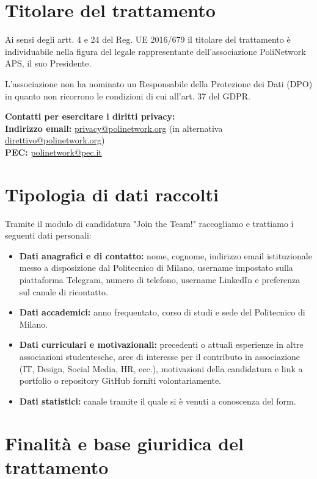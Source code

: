 \documentclass[legal]{polinetwork}
\begin{document}
\pnMakeHeader

\section{Titolare del trattamento}

Ai sensi degli artt. 4 e 24 del Reg. UE 2016/679 il titolare del trattamento è individuabile nella figura del legale rappresentante dell'associazione PoliNetwork APS, il suo Presidente.

L'associazione non ha nominato un Responsabile della Protezione dei Dati (DPO) in quanto non ricorrono le condizioni di cui all'art. 37 del GDPR.

\textbf{Contatti per esercitare i diritti privacy:} \\
\textbf{Indirizzo email:} \href{mailto:privacy@polinetwork.org}{privacy@polinetwork.org} (in alternativa \href{mailto:direttivo@polinetwork.org}{direttivo@polinetwork.org}) \\
\textbf{PEC:} \href{mailto:polinetwork@pec.it}{polinetwork@pec.it}

\section{Tipologia di dati raccolti}

Tramite il modulo di candidatura "Join the Team!" raccogliamo e trattiamo i seguenti dati personali:
\begin{itemize}
    \item \textbf{Dati anagrafici e di contatto:} nome, cognome, indirizzo email istituzionale messo a disposizione dal Politecnico di Milano, username impostato sulla piattaforma Telegram, numero di telefono, username LinkedIn e preferenza sul canale di ricontatto.
    \item \textbf{Dati accademici:} anno frequentato, corso di studi e sede del Politecnico di Milano.
    \item \textbf{Dati curriculari e motivazionali:} precedenti o attuali esperienze in altre associazioni studentesche, aree di interesse per il contributo in associazione (IT, Design, Social Media, HR, ecc.), motivazioni della candidatura e link a portfolio o repository GitHub forniti volontariamente.
    \item \textbf{Dati statistici:} canale tramite il quale si è venuti a conoscenza del form.
\end{itemize}

\section{Finalità e base giuridica del trattamento}
\end{document}
